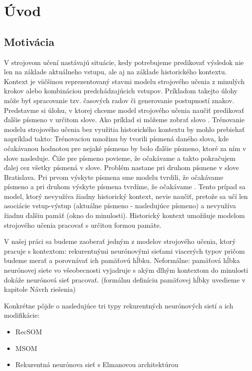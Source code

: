 \chapter{Úvod}

\section{Motivácia}
V strojovom učení nastávajú situácie, kedy potrebujeme predikovať výsledok nie len na 
základe aktuálneho vstupu, ale aj na základe historického kontextu. 
Kontext je väčšinou reprezentovaný stavmi modelu strojového učenia z minulých krokov alebo kombináciou predchádzajúcich vstupov.
Príkladom takejto úlohy môže byť spracovanie tzv. časových radov či generovanie postupností znakov.
Predstavme si úlohu, v ktorej chceme model strojového učenia naučiť predikovať ďalšie písmeno v určitom slove. 
Ako príklad si môžeme zobrať slovo . 
Trénovanie modelu strojového učenia bez využitia historického kontextu by mohlo prebiehať napríklad takto:
Trénovaciou množinu by tvorili písmená daného slova, kde očakávanou hodnotou pre nejaké písmeno by bolo ďalšie písmeno, ktoré za ním v slove nasleduje.
Čiže pre písmeno  povieme, že očakávame  a takto pokračujem ďalej cez všetky písmená v slove.
Problém nastane pri druhom písmene  v slove Bratislava. Pri prvom výskyte písmena  sme modelu tvrdili, že očakávame písmeno  a 
pri druhom výskyte písmena  tvrdíme, že očakávame . 
Tento prípad sa model, ktorý nevyužíva žiadny historický kontext, 
nevie naučiť, pretože sa učí len asociácie vstup-výstup (aktuálne písmeno - nasledujúce písmeno) a nevyužíva žiadnu ďalšiu pamäť (okno do minulosti).
Historický kontext umožňuje modelom strojového učenia pracovať s určitou formou pamäte.

V našej práci sa budeme zaoberať jedným z modelov strojového učenia, 
ktorý pracuje s kontextom: rekurentnými neurónovými sieťami viacerých typov pričom
budeme merať a porovnávať ich pamäťovú hĺbku. 
Neformálne: pamäťová hĺbka neurónovej siete vo všeobecnosti vyjadruje s akým dlhým kontextom do minulosti dokáže neurónová sieť pracovať.
(formálnu definíciu pamäťovej hĺbky uvedieme v kapitole Návrh riešenia)

Konkrétne pôjde o nasledujúce tri typy rekurentných neurónových sietí a ich modifikácie:
\begin{itemize}
	\item RecSOM
	\item MSOM
	\item Rekurentná neurónova sieť s Elmanovou architektúrou
\end{itemize}

